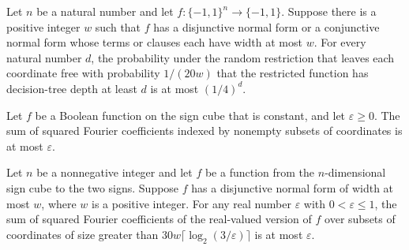 \begin{theorem}
\label{FABL.hastadQuarterSwitchingBoundForFormula}
\leanok
{}
Let $n$ be a natural number and let $f:\{-1,1\}^n\to\{-1,1\}$. Suppose there is a
positive integer $w$ such that $f$ has a disjunctive normal form or a conjunctive normal
form whose terms or clauses each have width at most $w$. For every natural number $d$,
the probability under the random restriction that leaves each coordinate free with
probability $1/(20w)$ that the restricted function has decision-tree depth at least $d$
is at most $(1/4)^d$.
\end{theorem}

\begin{theorem}
\label{FABL.isFourierSpectrumConcentratedUpTo_zero_of_constant}
\leanok
{}
Let $f$ be a Boolean function on the sign cube that is constant, and let $\varepsilon\ge
0$. The sum of squared Fourier coefficients indexed by nonempty subsets of coordinates
is at most $\varepsilon$.
\end{theorem}

\begin{theorem}
\label{FABL.theorem4_22_of_pos}
\leanok
{}
Let $n$ be a nonnegative integer and let $f$ be a function from the $n$-dimensional sign
cube to the two signs. Suppose $f$ has a disjunctive normal form of width at most $w$,
where $w$ is a positive integer. For any real number $\varepsilon$ with
$0<\varepsilon\le 1$, the sum of squared Fourier coefficients of the real-valued version
of $f$ over subsets of coordinates of size greater than
$30w\lceil\log_2(3/\varepsilon)\rceil$ is at most $\varepsilon$.
\end{theorem}

